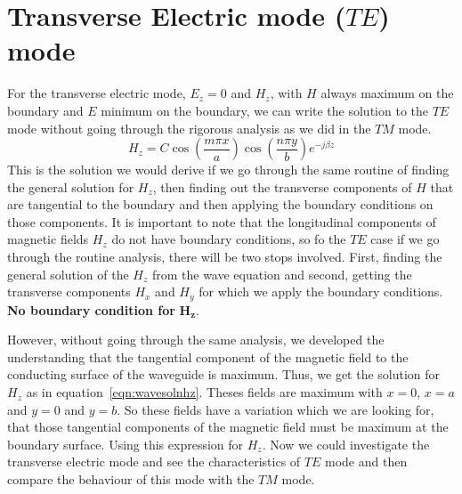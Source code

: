 \section{Transverse Electric mode ($TE$) mode}
For the transverse electric mode, $E_{z} = 0$ and $H_{z}$, with $H$ always maximum on the boundary and $E$ minimum on the boundary, we can write the solution to the $TE$ mode without going through the rigorous analysis as we did in the $TM$ mode.
\begin{equation}
H_z = C\cos\left(\frac{m\pi x}{a}\right) \cos\left(\frac{n\pi y}{b}\right)e^{-j\beta z}
\label{eqn:wavesolnhz}
\end{equation}
This is the solution we would derive if we go through the same routine of finding the general solution for $H_z$, then finding out the transverse components of $H$ that are tangential to the boundary and then applying the boundary conditions on those components. It is important to note that the longitudinal components of magnetic fields $H_z$ do not have boundary conditions, so fo the $TE$ case if we go through the routine analysis, there will be two stops involved. First, finding the general solution of the $H_z$ from the wave equation and second, getting the transverse components $H_x$ and $H_y$ for which we apply the boundary conditions. \textbf{No boundary condition for} $\boldsymbol{H_z}$.

However, without going through the same analysis, we developed the understanding that the tangential component of the magnetic field to the conducting surface of the waveguide is maximum. Thus, we get the solution for $H_z$ as in equation~\ref{eqn:wavesolnhz}. Theses fields are maximum with $x=0$, $x=a$ and $y=0$ and $y=b$. So these fields have a variation which we are looking for, that those tangential components of the magnetic field must be maximum at the boundary surface. Using this expression for $H_z$. Now we could investigate the transverse electric mode and see the characteristics of $TE$ mode and then compare the behaviour of this mode with the $TM$ mode.